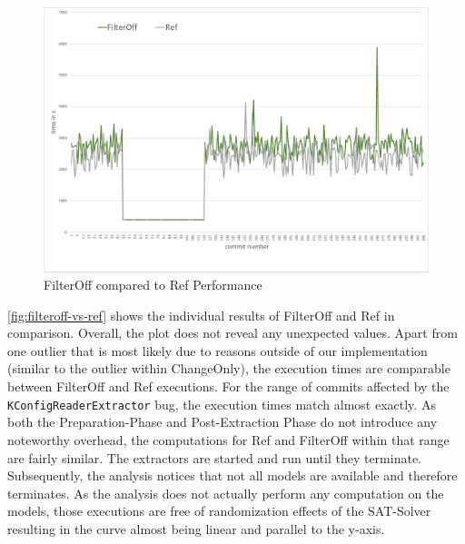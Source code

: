 \documentclass[a4paper]{article}
\begin{document}
\begin{figure}[h] 
  \centering
  \begin{minipage}[b]{1\textwidth} 
    \caption[FilterOff compared to Ref Performance]{FilterOff compared to Ref Performance}\label{fig:filteroff-vs-ref}
    \centering
    \includegraphics[height=1\textwidth, angle=90]{img/filteroff-vs-ref.pdf}
  \end{minipage}
\end{figure}


\autoref{fig:filteroff-vs-ref} shows the individual results of \textcolor{green!50!black}{FilterOff} and \textcolor{gray!80!black}{Ref} in comparison. Overall, the plot does not reveal any unexpected values. Apart from one outlier that is most likely due to reasons outside of our implementation (similar to the outlier within ChangeOnly), the execution times are comparable between FilterOff and Ref executions. For the range of commits affected by the \texttt{KConfigReaderExtractor} bug, the execution times match almost exactly. As both the Preparation-Phase and Post-Extraction Phase do not introduce any noteworthy overhead, the computations for Ref and FilterOff within that range are fairly similar. The extractors are started and run until they terminate. Subsequently, the analysis notices that not all models are available and therefore terminates. As the analysis does not actually perform any computation on the models, those executions are free of randomization effects of the SAT-Solver resulting in the curve almost being linear and parallel to the y-axis.
\end{document}
